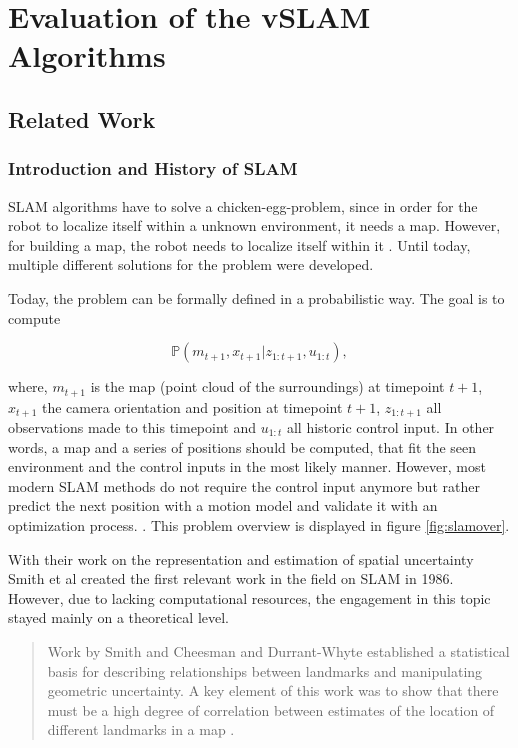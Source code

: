 \chapter{Evaluation of the vSLAM Algorithms}
\section{Related Work}

\subsection{Introduction and History of SLAM}

SLAM algorithms have to solve a chicken-egg-problem, since in order for the robot to localize itself within a unknown environment, 
it needs a map. However, for building a map, the robot needs to localize itself within it \cite{chicken}. Until today, multiple 
different solutions for the problem were developed. 

Today, the problem can be formally defined in a probabilistic way. The goal is to compute 

\begin{equation}\label{prob}
\mathbb{P}\left(m_{t+1},x_{t+1}|z_{1:t+1},u_{1:t}\right),
\end{equation}

where, $m_{t+1}$ is the map (point cloud of the surroundings) at timepoint $t+1$, $x_{t+1}$ the 
camera orientation and position at timepoint $t+1$, $z_{1:t+1}$ all observations made to this timepoint and $u_{1:t}$ all historic control input. 
In other words, a map and a series of positions should be computed, that fit the seen environment and the control inputs in the most likely manner. 
However, most
modern SLAM methods do not require the control input anymore but rather predict the next position with a motion model and validate it with an 
optimization process. \cite{dso} \cite{orb}. 
This problem overview is displayed in figure \ref{fig:slamover}. 


With their work on the representation and estimation of spatial uncertainty \cite{hist1}
Smith et al created the first relevant work in the field on SLAM in 1986. However, due to lacking computational resources, the engagement in this topic stayed mainly
on a theoretical level. 

  \begin{quote}
	 Work by Smith and
Cheesman and Durrant-Whyte established a statistical basis for describing relationships between landmarks and
manipulating geometric uncertainty. A key element of this
work was to show that there must be a high degree of correlation between estimates of the location of different landmarks in a map \cite{hist2}.
  \end{quote}

